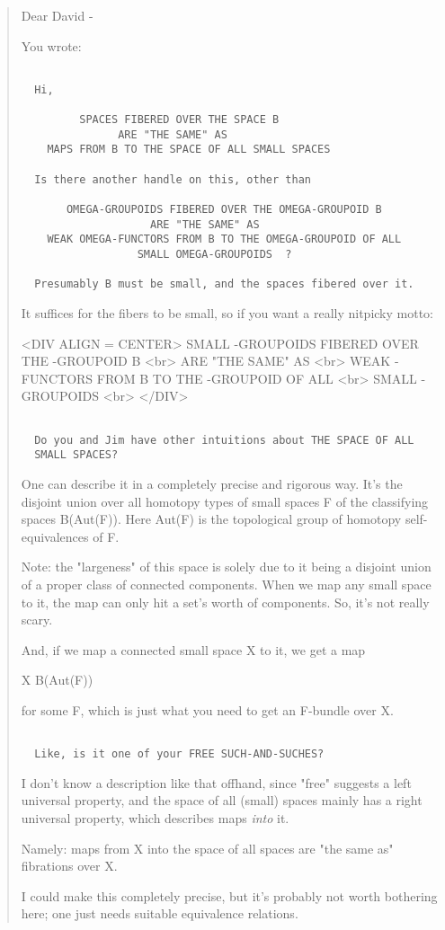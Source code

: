 \begin{quote}
 Dear David - 

 You wrote:


\begin{verbatim}

  Hi,
  
         SPACES FIBERED OVER THE SPACE B 
               ARE "THE SAME" AS 
    MAPS FROM B TO THE SPACE OF ALL SMALL SPACES 
  
  Is there another handle on this, other than
  
       OMEGA-GROUPOIDS FIBERED OVER THE OMEGA-GROUPOID B 
                    ARE "THE SAME" AS 
    WEAK OMEGA-FUNCTORS FROM B TO THE OMEGA-GROUPOID OF ALL
                  SMALL OMEGA-GROUPOIDS  ?
  
  Presumably B must be small, and the spaces fibered over it.
\end{verbatim}
    

 It suffices for the fibers to be small, so if you want a really
nitpicky motto:

<DIV ALIGN = CENTER>
    SMALL \omega -GROUPOIDS FIBERED OVER THE \omega -GROUPOID B <br>
                    ARE "THE SAME" AS <br>
    WEAK \omega -FUNCTORS FROM B TO THE \omega -GROUPOID OF ALL <br>
              SMALL \omega -GROUPOIDS <br> 
</DIV>


\begin{verbatim}

  Do you and Jim have other intuitions about THE SPACE OF ALL
  SMALL SPACES? 
\end{verbatim}
    
 One can describe it in a completely precise and rigorous way.
 It's the disjoint union over all homotopy types of small
 spaces F of the classifying spaces B(Aut(F)).  Here Aut(F) is the 
 topological group of homotopy self-equivalences of F.
 
 Note: the "largeness" of this space is solely due to it being a 
 disjoint union of a proper class of connected components.  When 
 we map any small space to it, the map can only hit a set's worth
 of components.  So, it's not really scary.

 And, if we map a connected small space X to it, we get a map 

 X \to  B(Aut(F)) 

 for some F, which is just what you need to get an F-bundle over X.


\begin{verbatim}

  Like, is it one of your FREE SUCH-AND-SUCHES?
\end{verbatim}
    
 I don't know a description like that offhand, since "free" suggests
 a left universal property, and the space of all (small) spaces mainly 
 has a right universal property, which describes maps \emph{into} it.

 Namely: maps from X into the space of all spaces are "the same as"
 fibrations over X.

I could make this completely precise, but it's probably not worth bothering
here; one just needs suitable equivalence relations.

\end{quote}
